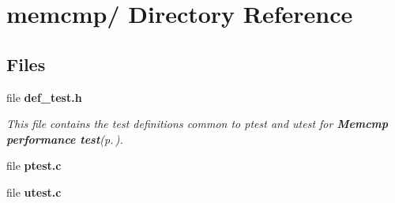 \section{memcmp/ Directory Reference}
\label{dir_000005}
\subsection*{Files}
\begin{CompactItemize}
\item 
file {\bf def\_\-test.h}
\begin{CompactList}\small\item\em This file contains the test definitions common to ptest and utest for {\bf Memcmp performance test}{\rm (p.\,\pageref{group__memcmp__test})}. \item\end{CompactList}

\item 
file {\bf ptest.c}
\item 
file {\bf utest.c}
\end{CompactItemize}

